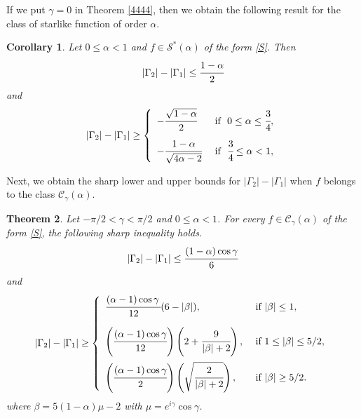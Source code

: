 \documentclass[a4paper,12pt]{amsart}
\newtheorem{theorem}{Theorem}[section]
\newtheorem{corollary}[theorem]{Corollary}
\theoremstyle{definition}
\numberwithin{equation}{section}
\begin{document}
\noindent If we put  $\gamma=0$ in Theorem \ref{4444}, then we obtain the following result for the class of starlike function of order $\alpha$.
\begin{corollary}\label{444}
Let $0 \le \alpha < 1$ and  $f\in \mathcal{S}^*(\alpha)$ of the form \eqref{S}. Then
\begin{equation}
|\Gamma_2|-|\Gamma_1|\le \cfrac{1-\alpha}{2}
\end{equation}
and
\begin{equation}
|\Gamma_2|-|\Gamma_1|\geq \left \{
	\begin{array}{ll}
		  -\cfrac{\sqrt{1-\alpha}}{2}  & {\mbox{ if }} \,\,  0 \leq \alpha \leq \cfrac{3}{4},
		\\[4mm]
		  -\cfrac{1-\alpha}{\sqrt{4\alpha-2}}  &  {\mbox{ if }} \,\, \cfrac{3}{4} \leq \alpha < 1,
	\end{array}
	\right.
\end{equation}
\end{corollary}

\noindent Next, we obtain the sharp lower and upper bounds for $|\Gamma_2|-|\Gamma_1|$ when $f$ belongs to the class  $\mathcal{C}_{\gamma}(\alpha)$.
\begin{theorem}\label{3}
Let $-\pi/2< \gamma< \pi/2$ and $0\le \alpha <1$. For every $f\in \mathcal{C}_{\gamma}(\alpha)$ of the form \eqref{S}, the following sharp inequality holds.
	\begin{equation}\label{55555}
	|\Gamma_2|-|\Gamma_1|\le \cfrac{(1-\alpha)\cos \gamma}{6}
	\end{equation}
	and
	\begin{equation}\label{l}
|\Gamma_2|-|\Gamma_1|\ge\left \{
\begin{array}{lll}
\cfrac{(\alpha-1)\cos \gamma \,}{12}(6-|\beta|) , & {\mbox{ if }} |\beta| \le 1,\\[5mm]
\left(\cfrac{(\alpha-1)\cos \gamma}{12}\right)\left(2+\cfrac{9}{|\beta|+2}\right), & {\mbox{ if }} 1 \le |\beta| \le 5/2,\\[5mm]
\left(\cfrac{(\alpha-1)\cos \gamma}{2}\right)\left(\sqrt{\cfrac{2}{|\beta|+2}}\right), &{\mbox{ if }} |\beta| \ge 5/2.
\end{array}
\right.
\end{equation}
where $\beta=5(1-\alpha)\mu-2$ with $\mu=e^{i\gamma}\cos \gamma$.
\end{theorem}
\end{document}
